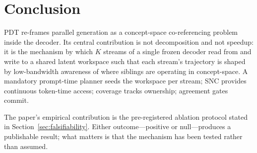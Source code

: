 \section{Conclusion}

PDT re-frames parallel generation as a concept-space co-referencing problem inside the decoder. Its central contribution is not decomposition and not speedup: it is the mechanism by which $K$ streams of a single frozen decoder read from and write to a shared latent workspace such that each stream's trajectory is shaped by low-bandwidth awareness of where siblings are operating in concept-space. A mandatory prompt-time planner seeds the workspace per stream; SNC provides continuous token-time access; coverage tracks ownership; agreement gates commit.

The paper's empirical contribution is the pre-registered ablation protocol stated in Section~\ref{sec:falsifiability}. Either outcome---positive or null---produces a publishable result; what matters is that the mechanism has been tested rather than assumed.
